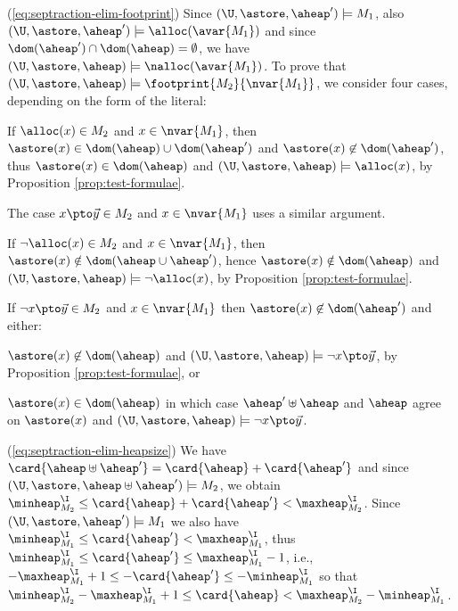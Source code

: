 {  (\ref{eq:septraction-elim-footprint}) Since $(\U,\astore,\aheap')
  \models M_1$, also $(\U,\astore,\aheap') \models \alloc(\avar{M_1})$
  and since $\dom(\aheap') \cap \dom(\aheap) = \emptyset$, we have
  $(\U,\astore,\aheap) \models \nalloc(\avar{M_1})$. To prove that
  $(\U,\astore,\aheap) \models \footprint{M_2}{\nvar{M_1}}$, we
  consider four cases, depending on the form of the
  literal: \begin{compactitem}
    \item If $\alloc(x) \in M_2$ and $x \in \nvar{M_1}$, then
      $\astore(x) \in \dom(\aheap) \cup \dom(\aheap')$ and $\astore(x)
      \not\in \dom(\aheap')$, thus $\astore(x) \in \dom(\aheap)$ and
      $(\U,\astore,\aheap) \models \alloc(x)$, by Proposition
      \ref{prop:test-formulae}.
    \item The case $x \pto \vec{y} \in M_2$ and $x \in \nvar{M_1}$
      uses a similar argument.
    \item If $\neg \alloc(x) \in M_2$ and $x\in \nvar{M_1}$, then
      $\astore(x) \notin \dom(\aheap\cup \aheap')$, hence
      $\astore(x)\notin\dom(\aheap)$ and $(\U, \astore, \aheap)
      \models \neg\alloc(x)$, by Proposition
      \ref{prop:test-formulae}.
    \item If $\neg x \pto \vec{y} \in M_2$ and $x \in \nvar{M_1}$ then
      $\astore(x) \not\in \dom(\aheap')$ and
      either: \begin{compactitem}
      \item $\astore(x) \not\in \dom(\aheap)$ and $(\U,\astore,\aheap)
        \models \neg x \pto \vec{y}$, by Proposition
        \ref{prop:test-formulae}, or
      \item $\astore(x) \in \dom(\aheap)$ in which case $\aheap' \uplus \aheap$
        and $\aheap$ agree on $\astore(x)$ and $(\U,\astore,\aheap)
        \models \neg x \pto \vec{y}$.
    \end{compactitem}
  \end{compactitem}

  (\ref{eq:septraction-elim-heapsize}) We have $\card{\aheap \uplus
    \aheap'} = \card{\aheap} + \card{\aheap'}$ and since
  $(\U,\astore,\aheap \uplus \aheap') \models M_2$, we obtain
  $\minheap^\I_{M_2} \leq \card{\aheap} + \card{\aheap'} <
  \maxheap^\I_{M_2}$.  Since $(\U,\astore,\aheap') \models M_1$ we
  also have $\minheap^\I_{M_1} \leq \card{\aheap'} <
  \maxheap^\I_{M_1}$, thus $\minheap^\I_{M_1}
  \leq \card{\aheap'} \leq \maxheap^\I_{M_1}-1$, i.e.,
  $-\maxheap^\I_{M_1}+1 \leq -\card{\aheap'} \leq -\minheap^\I_{M_1}$
  so that $\minheap^\I_{M_2} - \maxheap^\I_{M_1} +1 \leq \card{\aheap}
  < \maxheap^\I_{M_2} - \minheap^\I_{M_1}$. 

}
